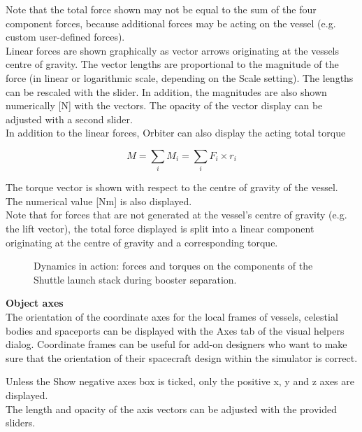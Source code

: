 \documentclass[Orbiter User Manual.tex]{subfiles}
\begin{document}
\noindent
Note that the total force shown may not be equal to the sum of the four component forces, because additional forces may be acting on the vessel (e.g. custom user-defined forces).\\
Linear forces are shown graphically as vector arrows originating at the vessels centre of gravity. The vector lengths are proportional to the magnitude of the force (in linear or logarithmic scale, depending on the Scale setting). The lengths can be rescaled with the slider. In addition, the magnitudes are also shown numerically [N] with the vectors. The opacity of the vector display can be adjusted with a second slider.\\
In addition to the linear forces, Orbiter can also display the acting total torque

\[ M = \sum_{i} M_{i}= \sum_{i} F_{i} \times r_{i} \]

\noindent
The torque vector is shown with respect to the centre of gravity of the vessel. The numerical value [Nm] is also displayed.\\
Note that for forces that are not generated at the vessel’s centre of gravity (e.g. the lift vector), the total force displayed is split into a linear component originating at the centre of gravity and a corresponding torque.

\begin{figure}[H]
	\centering
	\caption{Dynamics in action: forces and torques on the components of the Shuttle launch stack during booster separation.}
\end{figure}

\noindent
\textbf{Object axes}\\
The orientation of the coordinate axes for the local frames of vessels, celestial bodies and spaceports can be displayed with the Axes tab of the visual helpers dialog. Coordinate frames can be useful for add-on designers who want to make sure that the orientation of their spacecraft design within the simulator is correct.

\begin{figure}[H]
	\centering
\end{figure}

\noindent
Unless the Show negative axes box is ticked, only the positive x, y and z axes are displayed.\\
The length and opacity of the axis vectors can be adjusted with the provided sliders.
\end{document}
